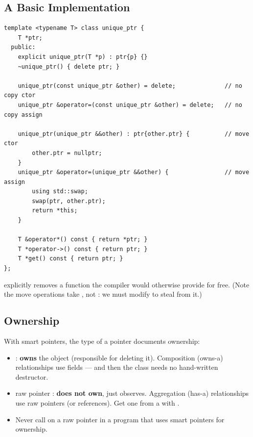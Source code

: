 \subsection{A Basic Implementation}
\begin{lstlisting}[style=cpp]
template <typename T> class unique_ptr {
    T *ptr;
  public:
    explicit unique_ptr(T *p) : ptr{p} {}
    ~unique_ptr() { delete ptr; }

    unique_ptr(const unique_ptr &other) = delete;              // no copy ctor
    unique_ptr &operator=(const unique_ptr &other) = delete;   // no copy assign

    unique_ptr(unique_ptr &&other) : ptr{other.ptr} {          // move ctor
        other.ptr = nullptr;
    }
    unique_ptr &operator=(unique_ptr &&other) {                // move assign
        using std::swap;
        swap(ptr, other.ptr);
        return *this;
    }

    T &operator*() const { return *ptr; }
    T *operator->() const { return ptr; }
    T *get() const { return ptr; }
};
\end{lstlisting}
 explicitly removes a function the compiler would otherwise
provide for free. (Note the move operations take , not
: we must modify  to steal from it.)

\subsection{Ownership}
With smart pointers, the type of a pointer documents ownership:
\begin{itemize}
  \item {}: \textbf{owns} the object (responsible for deleting
        it). Composition (owns-a) relationships use  fields ---
        and then the class needs no hand-written destructor.
  \item raw pointer : \textbf{does not own}, just observes.
        Aggregation (has-a) relationships use raw pointers (or references). Get
        one from a  with .
  \item Never call  on a raw pointer in a program that uses smart
        pointers for ownership.
\end{itemize}

